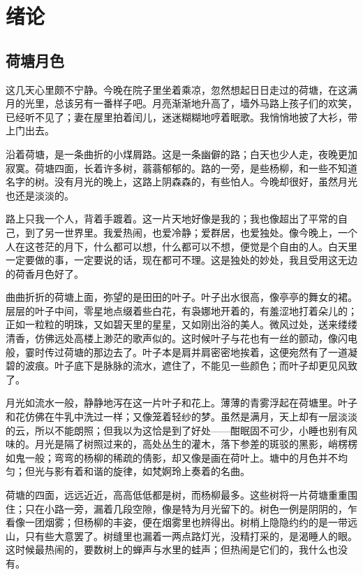 \chapter{绪论}
\section{荷塘月色}
这几天心里颇不宁静\citep{刘少奇1962论共产党员的修养}。今晚在院子里坐着乘凉，忽然想起日日走过的荷塘，在这满月的光里，总该另有一番样子吧。月亮渐渐地升高了，墙外马路上孩子们的欢笑，已经听不见了；妻在屋里拍着闰儿，迷迷糊糊地哼着眠歌。我悄悄地披了大衫，带上门出去。

沿着荷塘，是一条曲折的小煤屑路。这是一条幽僻的路；白天也少人走，夜晚更加寂寞。荷塘四面，长着许多树，蓊蓊郁郁的。路的一旁，是些杨柳，和一些不知道名字的树。没有月光的晚上，这路上阴森森的，有些怕人。今晚却很好，虽然月光也还是淡淡的。

路上只我一个人，背着手踱着。这一片天地好像是我的；我也像超出了平常的自己，到了另一世界里。我爱热闹，也爱冷静；爱群居，也爱独处。像今晚上，一个人在这苍茫的月下，什么都可以想，什么都可以不想，便觉是个自由的人。白天里一定要做的事，一定要说的话，现在都可不理。这是独处的妙处，我且受用这无边的荷香月色好了。

曲曲折折的荷塘上面，弥望的是田田的叶子。叶子出水很高，像亭亭的舞女的裙。层层的叶子中间，零星地点缀着些白花，有袅娜地开着的，有羞涩地打着朵儿的；正如一粒粒的明珠，又如碧天里的星星，又如刚出浴的美人。微风过处，送来缕缕清香，仿佛远处高楼上渺茫的歌声似的。这时候叶子与花也有一丝的颤动，像闪电般，霎时传过荷塘的那边去了。叶子本是肩并肩密密地挨着，这便宛然有了一道凝碧的波痕。叶子底下是脉脉的流水，遮住了，不能见一些颜色；而叶子却更见风致了。

月光如流水一般，静静地泻在这一片叶子和花上。薄薄的青雾浮起在荷塘里。叶子和花仿佛在牛乳中洗过一样；又像笼着轻纱的梦。虽然是满月，天上却有一层淡淡的云，所以不能朗照；但我以为这恰是到了好处——酣眠固不可少，小睡也别有风味的。月光是隔了树照过来的，高处丛生的灌木，落下参差的斑驳的黑影，峭楞楞如鬼一般；弯弯的杨柳的稀疏的倩影，却又像是画在荷叶上。塘中的月色并不均匀；但光与影有着和谐的旋律，如梵婀玲上奏着的名曲。

荷塘的四面，远远近近，高高低低都是树，而杨柳最多。这些树将一片荷塘重重围住；只在小路一旁，漏着几段空隙，像是特为月光留下的。树色一例是阴阴的，乍看像一团烟雾；但杨柳的丰姿，便在烟雾里也辨得出。树梢上隐隐约约的是一带远山，只有些大意罢了。树缝里也漏着一两点路灯光，没精打采的，是渴睡人的眼。这时候最热闹的，要数树上的蝉声与水里的蛙声；但热闹是它们的，我什么也没有。

